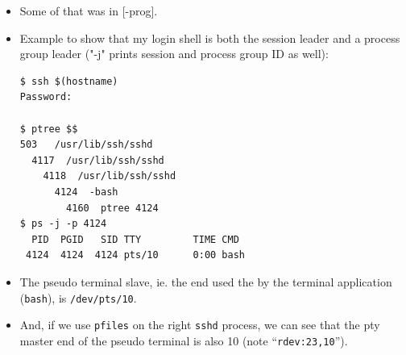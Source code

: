 \begin{itemize}
\item Some of that was in [\myun\myix-prog].
\item Example to show that my login shell is both the session leader and a
process group leader ("-j" prints session and process group ID as well):

\begin{verbatim}
$ ssh $(hostname)
Password: 

$ ptree $$
503   /usr/lib/ssh/sshd
  4117  /usr/lib/ssh/sshd
    4118  /usr/lib/ssh/sshd
      4124  -bash
        4160  ptree 4124
$ ps -j -p 4124
  PID  PGID   SID TTY         TIME CMD
 4124  4124  4124 pts/10      0:00 bash
\end{verbatim}
\item The pseudo terminal slave, ie. the end used the by the terminal
application (\texttt{bash}), is \texttt{/dev/pts/10}.
\item And, if we use \texttt{pfiles} on the right \texttt{sshd} process, we can
see that the pty master end of the pseudo terminal is also 10 (note
``\texttt{rdev:23,10}'').


\end{itemize}

